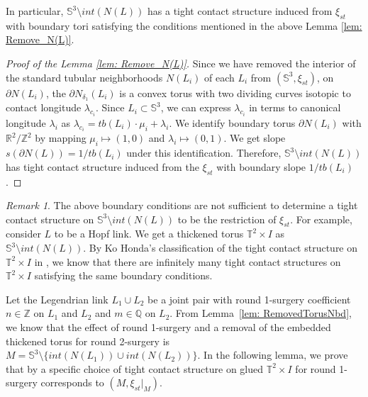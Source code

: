 \documentclass{amsart}
\theoremstyle{plain}
\theoremstyle{remark}
\newtheorem{rem}{Remark}
\theoremstyle{definition}
\newcommand{\s}{\mathbb{S}}
\newcommand{\dd}{\partial}
\begin{document}
In particular, $\s^3 \setminus int (N(L))$ has a tight contact structure induced from $\xi_{st}$ with boundary tori satisfying the conditions mentioned in the above Lemma \ref{lem: Remove_N(L)}. 

\begin{proof}[Proof of the Lemma \ref{lem: Remove_N(L)}]
  Since we have removed the interior of the standard tubular neighborhoods $N(L_i)$ of each $L_i$ from $\left(\s^3, \xi_{st}\right)$, on $\dd N(L_i)$, the $\dd N_{\delta_1}(L_i)$ is a convex torus with two dividing curves isotopic to contact longitude $\lambda_{c_i}$. 
    Since $L_i \subset \s^3$, we can express $\lambda_{c_i}$ in terms to canonical longitude $\lambda_i$ as $\lambda_{c_i}= tb(L_i)\cdot \mu_i + \lambda_i$. 
    We identify boundary torus $\dd N(L_i)$ with $\mathbb{R}^2/\mathbb{Z}^2$ by mapping $\mu_i\mapsto (1,0)$ and $\lambda_i \mapsto (0,1)$. 
    We get slope $s(\dd N(L))=1/tb(L_i)$ under this identification. 
    Therefore, $\s^3 \setminus int(N(L))$ has tight contact structure induced from the $\xi_{st}$ with boundary slope $1/tb(L_i)$. 
\end{proof}

\begin{rem}
    The above boundary conditions are not sufficient to determine a tight contact structure on $\s^3 \setminus int(N(L))$ to be the restriction of $\xi_{st}$. 
    For example, consider $L$ to be a Hopf link. We get a thickened torus $\mathbb{T}^2 \times I$ as $\s^3 \setminus int(N(L))$. 
    By Ko Honda's classification of the tight contact structure on $\mathbb{T}^2 \times I$ in \cite{KH}, we know that there are infinitely many tight contact structures on $\mathbb{T}^2 \times I$ satisfying the same boundary conditions. 
\end{rem}



Let the Legendrian link $L_{1}\cup L_{2}$ be a joint pair with round 1-surgery coefficient $n \in \mathbb{Z}$ on $L_{1}$ and $L_{2}$ and $m\in \mathbb{Q}$ on $L_{2}$. 
From Lemma~\ref{lem: RemovedTorusNbd}, we know that the effect of round 1-surgery and a removal of the embedded thickened torus for round 2-surgery is $M = \s^3 \setminus \{int(N(L_{1}))\cup int (N(L_{2}))\}$. 
In the following lemma, we prove that by a specific choice of tight contact structure on glued $\mathbb{T}^2 \times I $ for round 1-surgery corresponds to $(M, \xi_{st}|_M)$. 
\end{document}
